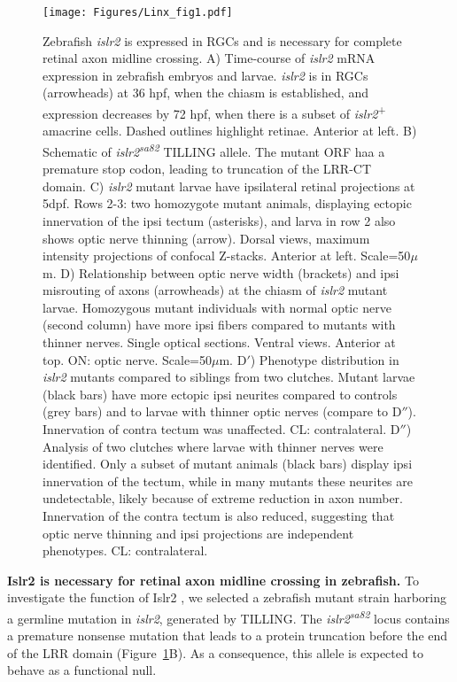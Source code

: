 \begin{figure}[hbtp]
    \begin{center}
        \texttt{[image: Figures/Linx\_fig1.pdf]}
        \caption[Zebrafish \emph{islr2} is expressed in RGCs and is necessary for complete retinal axon midline crossing.]
        {Zebrafish \emph{islr2} is expressed in RGCs and is necessary for complete retinal axon midline crossing.
		A) Time-course of \emph{islr2} mRNA expression in zebrafish embryos and larvae.
		\emph{islr2} is in RGCs (arrowheads) at 36 hpf, when the chiasm is established, and expression decreases by 72 hpf, when there is a subset of \emph{islr2}\textsuperscript{+} amacrine cells.
		Dashed outlines highlight retinae.
		Anterior at left.
		B) Schematic of \emph{islr2\textsuperscript{sa82}} TILLING allele.
		The mutant ORF haa a premature stop codon, leading to truncation of the LRR-CT domain.
		C) \emph{islr2} mutant larvae have ipsilateral retinal projections at 5dpf.
		Rows 2-3: two homozygote mutant animals, displaying ectopic innervation of the ipsi tectum (asterisks), and larva in row 2 also shows optic nerve thinning (arrow).
		Dorsal views, maximum intensity projections of confocal Z-stacks.
		Anterior at left.
		Scale=50$\mu$m.
		D) Relationship between optic nerve width (brackets) and ipsi misrouting of axons (arrowheads) at the chiasm of \emph{islr2} mutant larvae.
		Homozygous mutant individuals with normal optic nerve (second column) have more ipsi fibers compared to mutants with thinner nerves.
		Single optical sections.
		Ventral views.
		Anterior at top.
		ON: optic nerve.
		Scale=50$\mu$m. 
		D$'$) Phenotype distribution in \emph{islr2} mutants compared to siblings from two clutches.
		Mutant larvae (black bars) have more ectopic ipsi neurites compared to controls (grey bars) and to larvae with thinner optic nerves (compare to D$''$).
		Innervation of contra tectum was unaffected.
		CL: contralateral.
		D$''$) Analysis of two clutches where larvae with thinner nerves were identified.
		Only a subset of mutant animals (black bars) display ipsi innervation of the tectum, while in many mutants these neurites are undetectable, likely because of extreme reduction in axon number.
		Innervation of the contra tectum is also reduced, suggesting that optic nerve thinning and ipsi projections are independent phenotypes.
		CL: contralateral.
		}
        \label{Linxfig1}
    \end{center}
\end{figure}

\noindent\textbf{Islr2 is necessary for retinal axon midline crossing in zebrafish.}\newline
\indent To investigate the function of Islr2 \invivo{}, we selected a zebrafish mutant strain harboring a germline mutation in \emph{islr2}, generated by TILLING.
The \emph{islr2\textsuperscript{sa82}} locus contains a premature nonsense mutation that leads to a protein truncation before the end of the LRR domain (Figure~\ref{Linxfig1}B).
As a consequence, this allele is expected to behave as a functional null.

